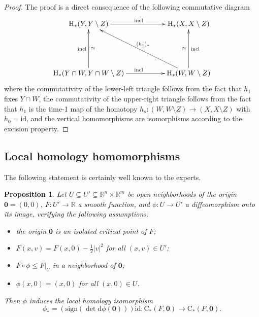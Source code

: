 \documentclass[reqno]{amsart}
\numberwithin{equation}{section}
\theoremstyle{personal}%
\newtheorem{prop}[thm]{Proposition}
\theoremstyle{definition}
\newcommand{\R}{\mathds{R}}
\newcommand{\diff}{\mathrm{d}}
\newcommand{\incl}{\mathrm{incl}}
\newcommand{\Hom}{\mathrm{H}}
\newcommand{\Loc}{\mathrm{C}}
\begin{document}
\begin{proof}
The proof is a direct consequence of the following commutative diagram
\begin{align*}
\xymatrix{
\Hom_*(Y,Y\setminus Z)
\ar[rr]^{\incl} 
& &
\Hom_*(X,X\setminus Z)\\\\
\Hom_*(Y\cap W,Y\cap W\setminus Z)
\ar[rr]^{\incl} 
\ar[uu]^{\incl}_{\cong}
& &
\Hom_*(W,W\setminus Z)
\ar[uu]_{\incl}^{\cong}
\ar[lluu]_{(h_1)_*} 
} 
\end{align*}
where the commutativity of the lower-left triangle follows from the fact that $h_1$ fixes $Y\cap W$, the commutativity of the upper-right triangle follows from the fact that $h_1$ is the time-1 map of the homotopy $h_s:(W,W\setminus Z)\to(X,X\setminus Z)$ with $h_0=\mathrm{id}$, and the vertical homomorphisms are isomorphisms according to the excision property.
\end{proof}


\subsection{Local homology homomorphisms}
The following statement is certainly well known to the experts.

\begin{prop}\label{p:local_homology_maps}
Let $U\subseteq U'\subseteq \R^n\times\R^m$ be open neighborhoods of the origin $\bm0=(0,0)$, $F:U'\to\R$ a smooth function, and $\phi:U\to U'$ a diffeomorphism onto its image, verifying the following assumptions:
\begin{itemize}
\item[(i)] the origin $\bm0$ is an isolated critical point of $F$;

\item[(ii)] $F(x,v)=F(x,0)-\tfrac12 |v|^2$ for all $(x,v)\in U'$;

\item[(iii)] $F\circ\phi\leq F|_U$ in a neighborhood of $\bm0$;

\item[(iv)] $\phi(x,0)=(x,0)$ for all $(x,0)\in U$.
\end{itemize}
Then $\phi$ induces the local homology isomorphism
\[\phi_*=(\mathrm{sign}(\det\diff\phi(\bm0)))\mathrm{id}:\Loc_*(F,\bm0)\to\Loc_*(F,\bm0).\]
\end{prop}
\end{document}
